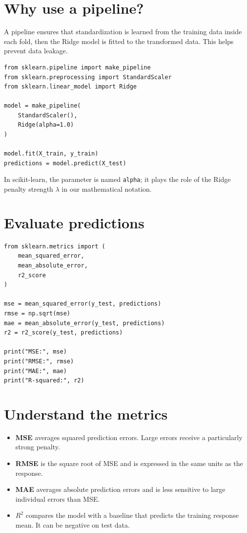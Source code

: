 \documentclass[11pt,a4paper,oneside]{book}
\theoremstyle{remark}
\begin{document}
\section{Why use a pipeline?}
A pipeline ensures that standardization is learned from the training data
inside each fold, then the Ridge model is fitted to the transformed data.
This helps prevent data leakage.

\begin{lstlisting}
from sklearn.pipeline import make_pipeline
from sklearn.preprocessing import StandardScaler
from sklearn.linear_model import Ridge

model = make_pipeline(
    StandardScaler(),
    Ridge(alpha=1.0)
)

model.fit(X_train, y_train)
predictions = model.predict(X_test)
\end{lstlisting}

In scikit-learn, the parameter is named \texttt{alpha}; it plays the role
of the Ridge penalty strength $\lambda$ in our mathematical notation.

\section{Evaluate predictions}
\begin{lstlisting}
from sklearn.metrics import (
    mean_squared_error,
    mean_absolute_error,
    r2_score
)

mse = mean_squared_error(y_test, predictions)
rmse = np.sqrt(mse)
mae = mean_absolute_error(y_test, predictions)
r2 = r2_score(y_test, predictions)

print("MSE:", mse)
print("RMSE:", rmse)
print("MAE:", mae)
print("R-squared:", r2)
\end{lstlisting}

\section{Understand the metrics}
\begin{itemize}
\item \textbf{MSE} averages squared prediction errors. Large errors receive
a particularly strong penalty.
\item \textbf{RMSE} is the square root of MSE and is expressed in the same
units as the response.
\item \textbf{MAE} averages absolute prediction errors and is less sensitive
to large individual errors than MSE.
\item \textbf{$R^2$} compares the model with a baseline that predicts the
training response mean. It can be negative on test data.
\end{itemize}
\end{document}
